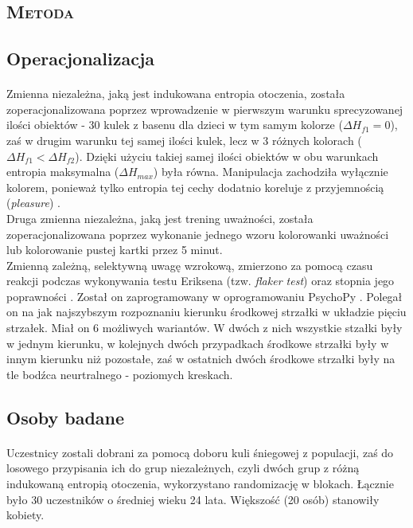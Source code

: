 \documentclass[12pt,a4paper,final,oneside,onecolumn,titlepage]{article}
\begin{document}
\begin{center}
\section*{\large{\textbf{\textsc{Metoda}}}}
\end{center}
\subsection*{\normalsize{\textbf{Operacjonalizacja}}}
\paragraph{}
Zmienna niezależna, jaką jest indukowana entropia otoczenia, została zoperacjonalizowana poprzez wprowadzenie w pierwszym warunku sprecyzowanej ilości obiektów - 30 kulek z basenu dla dzieci w tym samym kolorze ($\Delta H_{f1}=0$), zaś w drugim warunku tej samej ilości kulek, lecz w 3 różnych kolorach ($\Delta H_{f1}<\Delta H_{f2}$). Dzięki użyciu takiej samej ilości obiektów w obu warunkach entropia maksymalna ($\Delta H_{max}$) była równa. Manipulacja zachodziła wyłącznie kolorem, ponieważ tylko entropia tej cechy dodatnio koreluje z przyjemnością (\textit{pleasure}) \citep{stamps_entropy_2004, stamps_entropy_2002}.\\
Druga zmienna niezależna, jaką jest trening uważności, została zoperacjonalizowana poprzez wykonanie jednego wzoru kolorowanki uważności lub kolorowanie pustej kartki przez 5 minut.\\
Zmienną zależną, selektywną uwagę wzrokową, zmierzono za pomocą czasu reakcji podczas wykonywania testu Eriksena (tzw. \textit{flaker test}) oraz stopnia jego poprawności \citep{sanders_eriksen_2002}. Został on zaprogramowany w oprogramowaniu PsychoPy \citep{peirce_psychopy2_2019}. Polegał on na jak najszybszym rozpoznaniu kierunku środkowej strzałki w układzie pięciu strzałek. Miał on 6 możliwych wariantów. W dwóch z nich wszystkie stzałki były w jednym kierunku, w kolejnych dwóch przypadkach środkowe strzałki były w innym kierunku niż pozostałe, zaś w ostatnich dwóch środkowe strzałki były na tle bodźca neurtralnego - poziomych kreskach.
\subsection*{\normalsize{\textbf{Osoby badane}}}
\paragraph{}
Uczestnicy zostali dobrani za pomocą doboru kuli śniegowej z populacji, zaś do losowego przypisania ich do grup niezależnych, czyli dwóch grup z różną indukowaną entropią otoczenia, wykorzystano randomizację w blokach. Łącznie było 30 uczestników o średniej wieku 24 lata. Większość (20 osób) stanowiły kobiety.
\end{document}
